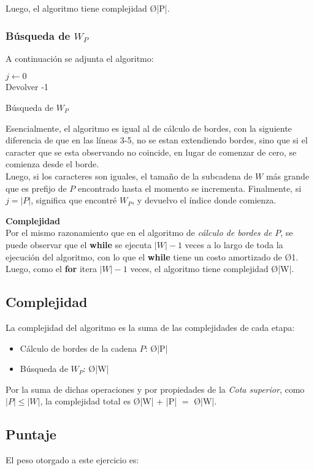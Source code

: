 Luego, el algoritmo tiene complejidad \O{|P|}.\\
\strut\hfill\qedsymbol

\subsubsection{Búsqueda de $W_P$}
A continuación se adjunta el algoritmo:\\
\begin{algorithm}[H]
 \DontPrintSemicolon
 $j \gets 0$\\
 Devolver -1
 \caption{Búsqueda de $W_P$}
\end{algorithm}

Esencialmente, el algoritmo es igual al de cálculo de bordes, con la siguiente diferencia de que en las líneas 3-5, no se estan extendiendo bordes, sino que si el caracter que se esta observando no coincide, en lugar de comenzar de cero, se comienza desde el borde.\\
Luego, si los caracteres son iguales, el tamaño de la subcadena de $W$ más grande que es prefijo de $P$ encontrado hasta el momento se incrementa.
Finalmente, si $j = |P|$, significa que encontré $W_P$, y devuelvo el índice donde comienza.

\textbf{Complejidad}\\
Por el mismo razonamiento que en el algoritmo de \emph{cálculo de bordes de $P$}, se puede observar que el \textbf{while} se ejecuta $|W|-1$ veces a lo largo de toda la ejecución del algoritmo, con lo que el \textbf{while} tiene un costo amortizado de \O{1}. Luego, como el \textbf{for} itera $|W|-1$ veces, el algoritmo tiene complejidad \O{|W|}.

\subsection{Complejidad}
La complejidad del algoritmo es la suma de las complejidades de cada etapa:
\begin{itemize}
	\item Cálculo de bordes de la cadena $P$: \O{|P|}
	\item Búsqueda de $W_P$: \O{|W|}
\end{itemize}

Por la suma de dichas operaciones y por propiedades de la \emph{Cota superior}, como $|P| \leq |W|$, la complejidad total es \O{|W| + |P|} $ = $ \O{|W|}.

\subsection{Puntaje}
El peso otorgado a este ejercicio es:
